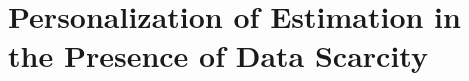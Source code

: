 	
	\tableofcontents
	\listoffigures
	\listoftables
	
	
	
	 
	
	\mainmatter
	
	
	
	
	\chapter{Personalization of Estimation in the Presence of Data Scarcity}\label{chapter:MP}
	
	
	\appendix
	
	
	\backmatter              %
	
	
	
	
	


\endinput
